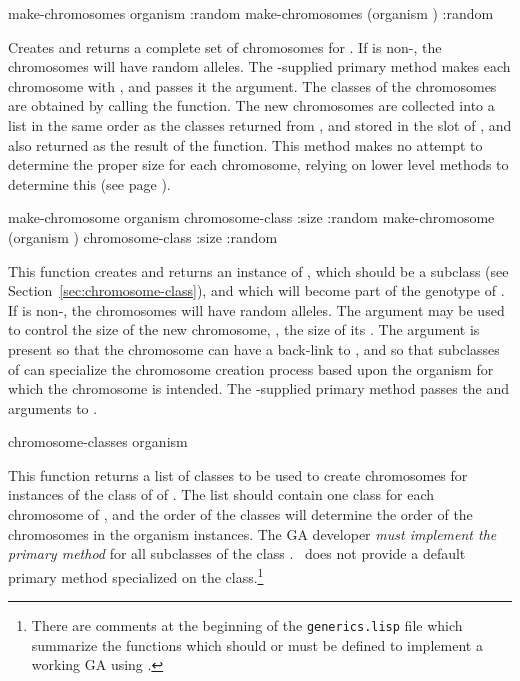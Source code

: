 {\filbreak
{\samepage
\Defgeneric make-chromosomes {organism \key :random}    \label{method:make-chromosomes}
 make-chromosomes {(organism ) \key :random}

Creates and returns a complete set of chromosomes for . If
 is non-, the chromosomes will have random alleles. The
\geco-supplied primary method makes each chromosome with
, and passes it the  argument. The classes
of the chromosomes are obtained by calling the 
function. The new chromosomes are collected into a list in the same order as the
classes returned from , and stored in the 
slot of , and also returned as the result of the function. This method
makes no attempt to determine the proper size for each chromosome, relying on lower
level methods to determine this (see page \pageref{chromosome:size.initarg}).
\par}%

\filbreak
{\samepage
\Defgeneric make-chromosome {organism chromosome-class \key :size :random}
 make-chromosome {(organism ) chromosome-class \key :size :random}
	\label{method:make-chromosome}

This function creates and returns an instance of ,
which should be a subclass  (see Section~\ref{sec:chromosome-class}),
and which will become part of the genotype of . If
 is non-, the chromosomes will have random alleles. The
 argument may be used to control the size of the new chromosome, \ie, the
size of its . The  argument is present so that the
chromosome can have a back-link to , and so that subclasses of
 can specialize the chromosome creation process based upon the
organism for which the chromosome is intended. The \geco-supplied primary method
passes the  and  arguments to .
\par}%

\filbreak
{\samepage
\Defgeneric chromosome-classes {organism}

This function returns a list of classes to be used to create chromosomes for
instances of the class of of . The list should contain one class for
each chromosome of , and the order of the classes will determine the
order of the chromosomes in the organism instances. The GA developer {\em must
implement the primary method} for all subclasses of the class .
\Geco\ does not provide a default primary method specialized on the 
class.\footnote{There are comments at the beginning of the {\tt generics.lisp} file
which summarize the functions which should or must be defined to implement a working
GA using \geco.}
\par}%

}
